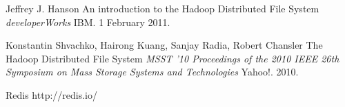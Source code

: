 \documentclass[twoside]{article}
\begin{document}
\begin{multicols}{2}
\begin{thebibliography}{99}
 Jeffrey J. Hanson
\newblock An introduction to the Hadoop Distributed File System
\newblock \textit{developerWorks}
\newblock IBM. 1 February 2011. 

 Konstantin Shvachko, Hairong Kuang, Sanjay Radia, Robert Chansler
\newblock The Hadoop Distributed File System
\newblock \textit{MSST '10 Proceedings of the 2010 IEEE 26th Symposium on Mass Storage Systems and Technologies}
\newblock Yahoo!. 2010.

 Redis
\newblock http://redis.io/

\end{thebibliography}



\end{multicols}
\end{document}
